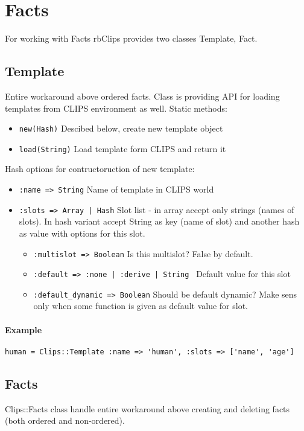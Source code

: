 \documentclass[a4paper,10pt]{article}
\begin{document}
\section{Facts}
For working with Facts rbClips provides two classes Template, Fact.

\subsection{Template}
Entire workaround above ordered facts. Class is providing API for loading templates from CLIPS environment as well. Static methods:
\begin{itemize}
 \item \texttt{new(Hash)} Descibed below, create new template object
 \item \texttt{load(String)} Load template form CLIPS and return it
\end{itemize}

Hash options for contructoruction of new template:
\begin{itemize}
 \item \texttt{:name => String} Name of template in CLIPS world
 \item \texttt{:slots => Array | Hash} Slot list - in array accept only strings (names of slots). In hash variant accept String as key (name of slot) and another hash as value with options for this slot.
	\begin{itemize}
	 \item \texttt{:multislot => Boolean} Is this multislot? False by default.
	 \item \texttt{:default => :none | :derive | String } Default value for this slot
	 \item \texttt{:default\_dynamic => Boolean} Should be default dynamic? Make sens only when some function is given as default value for slot.
	\end{itemize}
\end{itemize}

\paragraph{Example}
\begin{verbatim}
human = Clips::Template :name => 'human', :slots => ['name', 'age']
\end{verbatim}

\subsection{Facts}
Clips::Facts class handle entire workaround above creating and deleting facts (both ordered and non-ordered). 
\end{document}

